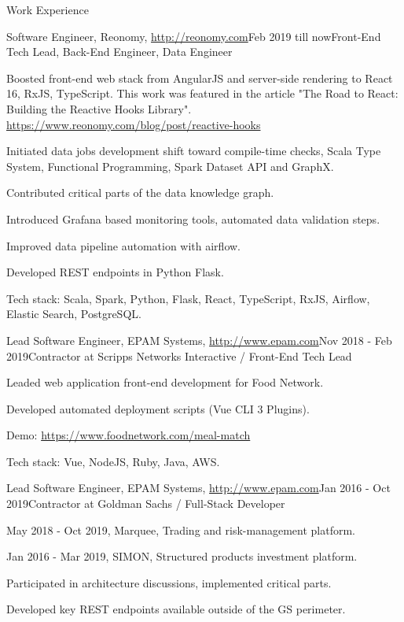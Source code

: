\documentclass{resume}
\begin{document}
\begin{rSection}{Work Experience}

\begin{rSubsection}{Software Engineer, Reonomy, \url{http://reonomy.com}}{Feb 2019 till now}{Front-End Tech Lead, Back-End Engineer, Data Engineer}{}
\item Boosted front-end web stack from AngularJS and server-side rendering to React 16, RxJS, TypeScript.
This work was featured in the article "The Road to React: Building the Reactive Hooks Library".
\url{https://www.reonomy.com/blog/post/reactive-hooks}
\item Initiated data jobs development shift toward compile-time checks, 
Scala Type System, Functional Programming, Spark Dataset API and GraphX.
\item Contributed critical parts of the data knowledge graph.
\item Introduced Grafana based monitoring tools, automated data validation steps.
\item Improved data pipeline automation with airflow.
\item Developed REST endpoints in Python Flask.

Tech stack: Scala, Spark, Python, Flask, React, TypeScript, RxJS, Airflow, Elastic Search, PostgreSQL.
\end{rSubsection}

\begin{rSubsection}{Lead Software Engineer, EPAM Systems, \url{http://www.epam.com}}{Nov 2018 - Feb 2019}{Contractor at Scripps Networks Interactive / Front-End Tech Lead}{}
\item Leaded web application front-end development for Food Network.
\item Developed automated deployment scripts (Vue CLI 3 Plugins).

Demo: \url{https://www.foodnetwork.com/meal-match}

Tech stack: Vue, NodeJS, Ruby, Java, AWS.
\end{rSubsection}

\begin{rSubsection}{Lead Software Engineer, EPAM Systems, \url{http://www.epam.com}}{Jan 2016 - Oct 2019}{Contractor at Goldman Sachs / Full-Stack Developer}{}
\item May 2018 - Oct 2019, Marquee, Trading and risk-management platform.
\item Jan 2016 - Mar 2019, SIMON, Structured products investment platform.
\item Participated in architecture discussions, implemented critical parts.
\item Developed key REST endpoints available outside of the GS perimeter.


\end{rSubsection}
\end{rSection}
\end{document}
